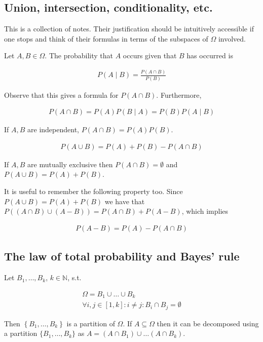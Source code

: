 \documentclass[a4paper, 12pt]{article}
\begin{document}
\subsection{Union, intersection, conditionality, etc.}

This is a collection of notes. Their justification should be intuitively
accessible if one stops and think of their formulas in terms of the subspaces of
$\Omega$ involved.

Let $A, B \in \Omega$. The probability that $A$ occurs given that $B$ has
occurred is 

\begin{align*}
    P(A \mid B) = \frac{P (A \cap B)}{P(B)}
\end{align*}    

Observe that this gives a formula for $P(A \cap B)$. Furthermore, 

\begin{align*}
    P(A \cap B) = P(A)P(B \mid A) = P(B)P(A \mid B)
\end{align*}

If $A, B$ are independent, $P(A \cap B) = P(A)P(B)$.

\begin{align*}
    P(A \cup B) = P(A) + P(B) - P(A \cap B)
\end{align*}

If $A, B$ are mutually exclusive then $P(A \cap B) = \emptyset$ and $P(A \cup B)
= P(A) + P(B)$.

It is useful to remember the following property too. Since $P(A \cup B) = P(A) +
P(B)$ we have that $P((A \cap B) \cup (A - B)) = P(A \cap B) + P(A - B)$, which
implies 

\begin{align*}
    P(A - B) = P(A) - P(A \cap B)
\end{align*}

\subsection{The law of total probability and Bayes' rule}

Let $B_1, \ldots, B_k$, $k \in \mathbb{N}$, s.t. 

\begin{align*}
    \Omega = B_1 \cup \ldots \cup B_k \\ 
    \forall i, j \in [1, k] : i \neq j : B_i \cap  B_j = \emptyset
\end{align*}

Then $\left\{ B_1, \ldots, B_k \right\} $ is a partition of $\Omega$. If $A
\subseteq \Omega$ then it can be decomposed using a partition $\{B_1, \ldots,
B_k\}$ as $A = (A \cap B_1) \cup \ldots (A \cap B_k)$.
\end{document}
